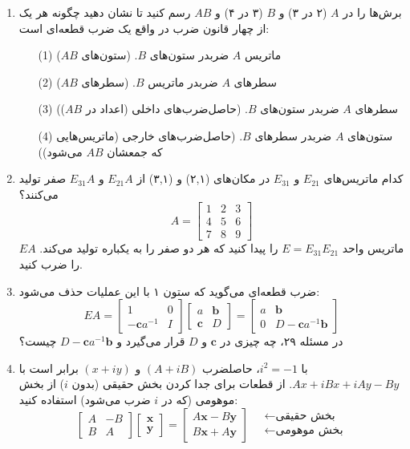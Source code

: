 \documentclass[12pt, a4paper]{book}
\begin{document}
\begin{enumerate}
		\item برش‌ها را در $A$ (۲ در ۳) و $B$ (۳ در ۴) و $AB$ رسم کنید تا نشان دهید چگونه هر یک از چهار قانون ضرب در واقع یک ضرب قطعه‌ای است:
		\begin{itemize}
			\item[(1)] ماتریس $A$ ضربدر ستون‌های $B$. (ستون‌های $AB$)
			\item[(2)] سطرهای $A$ ضربدر ماتریس $B$. (سطرهای $AB$)
			\item[(3)] سطرهای $A$ ضربدر ستون‌های $B$. (حاصل‌ضرب‌های داخلی (اعداد در $AB$))
			\item[(4)] ستون‌های $A$ ضربدر سطرهای $B$. (حاصل‌ضرب‌های خارجی (ماتریس‌هایی که جمعشان $AB$ می‌شود))
		\end{itemize}
		
		\item کدام ماتریس‌های $E_{21}$ و $E_{31}$ در مکان‌های (۲,۱) و (۳,۱) از $E_{21}A$ و $E_{31}A$ صفر تولید می‌کنند؟
		\[ A = \begin{bmatrix} 1 & 2 & 3 \\ 4 & 5 & 6 \\ 7 & 8 & 9 \end{bmatrix} \]
		ماتریس واحد $E = E_{31}E_{21}$ را پیدا کنید که هر دو صفر را به یکباره تولید می‌کند. $EA$ را ضرب کنید.
		
		\item ضرب قطعه‌ای می‌گوید که ستون ۱ با این عملیات حذف می‌شود:
		\[ EA = \begin{bmatrix} 1 & 0 \\ -\mathbf{c}a^{-1} & I \end{bmatrix} \begin{bmatrix} a & \mathbf{b} \\ \mathbf{c} & D \end{bmatrix} = \begin{bmatrix} a & \mathbf{b} \\ 0 & D-\mathbf{c}a^{-1}\mathbf{b} \end{bmatrix} \]
		در مسئله ۲۹، چه چیزی در $\mathbf{c}$ و $D$ قرار می‌گیرد و $D-\mathbf{c}a^{-1}\mathbf{b}$ چیست؟
		
		\item با $i^2=-1$، حاصلضرب $(A+iB)$ و $(x+iy)$ برابر است با $Ax+iBx+iAy-By$. از قطعات برای جدا کردن بخش حقیقی (بدون $i$) از بخش موهومی (که در $i$ ضرب می‌شود) استفاده کنید:
		\[ \begin{bmatrix} A & -B \\ B & A \end{bmatrix} \begin{bmatrix} \mathbf{x} \\ \mathbf{y} \end{bmatrix} = \begin{bmatrix} A\mathbf{x}-B\mathbf{y} \\ B\mathbf{x}+A\mathbf{y} \end{bmatrix} \quad \begin{array}{l} \leftarrow \text{بخش حقیقی} \\ \leftarrow \text{بخش موهومی} \end{array} \]
		

\end{enumerate}
\end{document}
